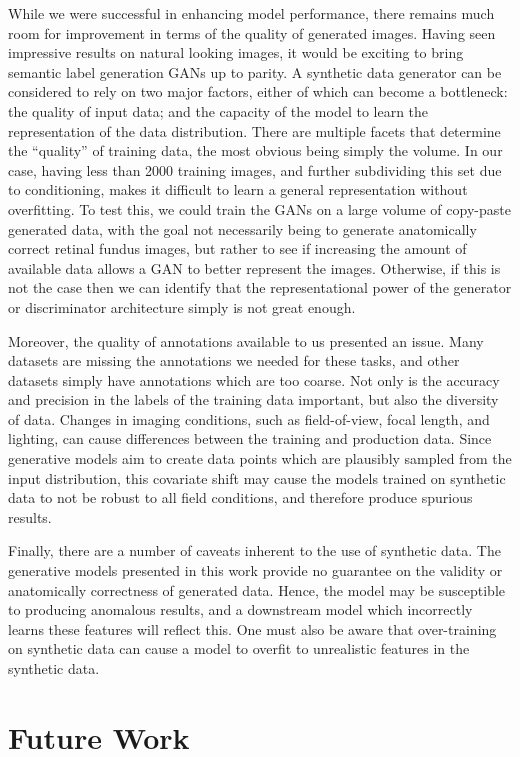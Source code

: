 While we were successful in enhancing model performance, there remains much room for improvement in terms of the quality of generated images.
Having seen impressive results on natural looking images, it would be exciting to bring semantic label generation GANs up to parity.
A synthetic data generator can be considered to rely on two major factors, either of which can become a bottleneck: the quality of input data; and the capacity of the model to learn the representation of the data distribution.
There are multiple facets that determine the ``quality'' of training data, the most obvious being simply the volume.
In our case, having less than 2000 training images, and further subdividing this set due to conditioning, makes it difficult to learn a general representation without overfitting.
To test this, we could train the GANs on a large volume of copy-paste generated data, with the goal not necessarily being to generate anatomically correct retinal fundus images, but rather to see if increasing the amount of available data allows a GAN to better represent the images.
Otherwise, if this is not the case then we can identify that the representational power of the generator or discriminator architecture simply is not great enough.

Moreover, the quality of annotations available to us presented an issue.
Many datasets are missing the annotations we needed for these tasks, and other datasets simply have annotations which are too coarse.
Not only is the accuracy and precision in the labels of the training data important, but also the diversity of data.
Changes in imaging conditions, such as field-of-view, focal length, and lighting, can cause differences between the training and production data.
Since generative models aim to create data points which are plausibly sampled from the input distribution, this covariate shift may cause the models trained on synthetic data to not be robust to all field conditions, and therefore produce spurious results.

Finally, there are a number of caveats inherent to the use of synthetic data.
The generative models presented in this work provide no guarantee on the validity or anatomically correctness of generated data.
Hence, the model may be susceptible to producing anomalous results, and a downstream model which incorrectly learns these features will reflect this.
One must also be aware that over-training on synthetic data can cause a model to overfit to unrealistic features in the synthetic data.

\section{Future Work}

